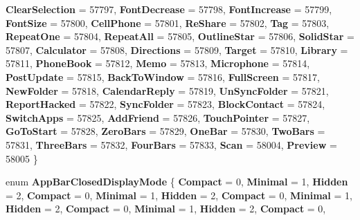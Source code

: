 \begin{DoxyCompactItemize}
{\bfseries Clear\+Selection} = 57797, 
\newline
{\bfseries Font\+Decrease} = 57798, 
{\bfseries Font\+Increase} = 57799, 
{\bfseries Font\+Size} = 57800, 
{\bfseries Cell\+Phone} = 57801, 
\newline
{\bfseries Re\+Share} = 57802, 
{\bfseries Tag} = 57803, 
{\bfseries Repeat\+One} = 57804, 
{\bfseries Repeat\+All} = 57805, 
\newline
{\bfseries Outline\+Star} = 57806, 
{\bfseries Solid\+Star} = 57807, 
{\bfseries Calculator} = 57808, 
{\bfseries Directions} = 57809, 
\newline
{\bfseries Target} = 57810, 
{\bfseries Library} = 57811, 
{\bfseries Phone\+Book} = 57812, 
{\bfseries Memo} = 57813, 
\newline
{\bfseries Microphone} = 57814, 
{\bfseries Post\+Update} = 57815, 
{\bfseries Back\+To\+Window} = 57816, 
{\bfseries Full\+Screen} = 57817, 
\newline
{\bfseries New\+Folder} = 57818, 
{\bfseries Calendar\+Reply} = 57819, 
{\bfseries Un\+Sync\+Folder} = 57821, 
{\bfseries Report\+Hacked} = 57822, 
\newline
{\bfseries Sync\+Folder} = 57823, 
{\bfseries Block\+Contact} = 57824, 
{\bfseries Switch\+Apps} = 57825, 
{\bfseries Add\+Friend} = 57826, 
\newline
{\bfseries Touch\+Pointer} = 57827, 
{\bfseries Go\+To\+Start} = 57828, 
{\bfseries Zero\+Bars} = 57829, 
{\bfseries One\+Bar} = 57830, 
\newline
{\bfseries Two\+Bars} = 57831, 
{\bfseries Three\+Bars} = 57832, 
{\bfseries Four\+Bars} = 57833, 
{\bfseries Scan} = 58004, 
\newline
{\bfseries Preview} = 58005
 \}
\item 
\mbox{\label{namespace_windows_1_1_u_i_1_1_xaml_1_1_controls_a69ed41c1bfc769995c091035ab6dd837}} 
enum {\bfseries App\+Bar\+Closed\+Display\+Mode} \{ \newline
{\bfseries Compact} = 0, 
{\bfseries Minimal} = 1, 
{\bfseries Hidden} = 2, 
{\bfseries Compact} = 0, 
\newline
{\bfseries Minimal} = 1, 
{\bfseries Hidden} = 2, 
{\bfseries Compact} = 0, 
{\bfseries Minimal} = 1, 
\newline
{\bfseries Hidden} = 2, 
{\bfseries Compact} = 0, 
{\bfseries Minimal} = 1, 
{\bfseries Hidden} = 2, 
\newline
{\bfseries Compact} = 0, 

\end{DoxyCompactItemize}
